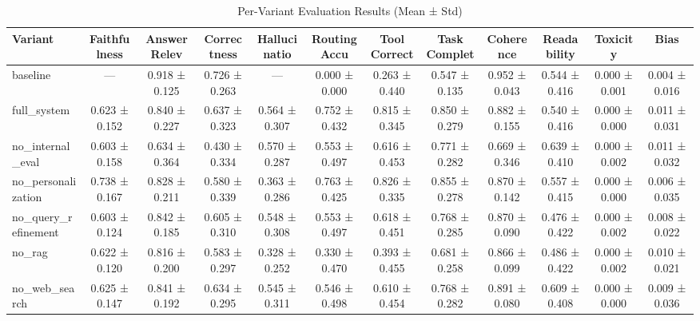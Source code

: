 \begin{table}[htbp]
\centering
\caption{Per-Variant Evaluation Results (Mean ± Std)}
\label{tab:per_variant}
\begin{tabular}{lccccccccccc}
\toprule
Variant & Faithfulness & Answer Relev & Correctness & Hallucinatio & Routing Accu & Tool Correct & Task Complet & Coherence & Readability & Toxicity & Bias \\
\midrule
baseline & — & 0.918 ± 0.125 & 0.726 ± 0.263 & — & 0.000 ± 0.000 & 0.263 ± 0.440 & 0.547 ± 0.135 & 0.952 ± 0.043 & 0.544 ± 0.416 & 0.000 ± 0.001 & 0.004 ± 0.016 \\
full\_system & 0.623 ± 0.152 & 0.840 ± 0.227 & 0.637 ± 0.323 & 0.564 ± 0.307 & 0.752 ± 0.432 & 0.815 ± 0.345 & 0.850 ± 0.279 & 0.882 ± 0.155 & 0.540 ± 0.416 & 0.000 ± 0.000 & 0.011 ± 0.031 \\
no\_internal\_eval & 0.603 ± 0.158 & 0.634 ± 0.364 & 0.430 ± 0.334 & 0.570 ± 0.287 & 0.553 ± 0.497 & 0.616 ± 0.453 & 0.771 ± 0.282 & 0.669 ± 0.346 & 0.639 ± 0.410 & 0.000 ± 0.002 & 0.011 ± 0.032 \\
no\_personalization & 0.738 ± 0.167 & 0.828 ± 0.211 & 0.580 ± 0.339 & 0.363 ± 0.286 & 0.763 ± 0.425 & 0.826 ± 0.335 & 0.855 ± 0.278 & 0.870 ± 0.142 & 0.557 ± 0.415 & 0.000 ± 0.000 & 0.006 ± 0.035 \\
no\_query\_refinement & 0.603 ± 0.124 & 0.842 ± 0.185 & 0.605 ± 0.310 & 0.548 ± 0.308 & 0.553 ± 0.497 & 0.618 ± 0.451 & 0.768 ± 0.285 & 0.870 ± 0.090 & 0.476 ± 0.422 & 0.000 ± 0.002 & 0.008 ± 0.022 \\
no\_rag & 0.622 ± 0.120 & 0.816 ± 0.200 & 0.583 ± 0.297 & 0.328 ± 0.252 & 0.330 ± 0.470 & 0.393 ± 0.455 & 0.681 ± 0.258 & 0.866 ± 0.099 & 0.486 ± 0.422 & 0.000 ± 0.002 & 0.010 ± 0.021 \\
no\_web\_search & 0.625 ± 0.147 & 0.841 ± 0.192 & 0.634 ± 0.295 & 0.545 ± 0.311 & 0.546 ± 0.498 & 0.610 ± 0.454 & 0.768 ± 0.282 & 0.891 ± 0.080 & 0.609 ± 0.408 & 0.000 ± 0.000 & 0.009 ± 0.036 \\
\bottomrule
\end{tabular}
\end{table}
